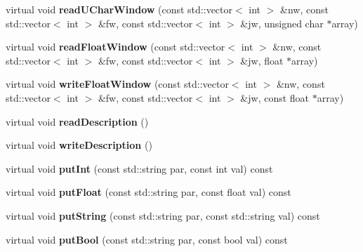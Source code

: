 \begin{DoxyCompactItemize}
virtual void {\bfseries read\+U\+Char\+Window} (const std\+::vector$<$ int $>$ \&nw, const std\+::vector$<$ int $>$ \&fw, const std\+::vector$<$ int $>$ \&jw, unsigned char $\ast$array)
\item 
\mbox{\label{class_s_e_p_1_1sep3d_file_a343dfb7ba9a50909270ef431933d810d}} 
virtual void {\bfseries read\+Float\+Window} (const std\+::vector$<$ int $>$ \&nw, const std\+::vector$<$ int $>$ \&fw, const std\+::vector$<$ int $>$ \&jw, float $\ast$array)
\item 
\mbox{\label{class_s_e_p_1_1sep3d_file_a6edcdb60efc62731e33f60aa32dbc2d4}} 
virtual void {\bfseries write\+Float\+Window} (const std\+::vector$<$ int $>$ \&nw, const std\+::vector$<$ int $>$ \&fw, const std\+::vector$<$ int $>$ \&jw, const float $\ast$array)
\item 
\mbox{\label{class_s_e_p_1_1sep3d_file_acb78ddaf3eb0c1afe66df1b468054d3d}} 
virtual void {\bfseries read\+Description} ()
\item 
\mbox{\label{class_s_e_p_1_1sep3d_file_a5e9edc876aa8b7fc1fa8f1f826655316}} 
virtual void {\bfseries write\+Description} ()
\item 
\mbox{\label{class_s_e_p_1_1sep3d_file_a3b4c3f4417a004c584a1f915a48d6283}} 
virtual void {\bfseries put\+Int} (const std\+::string par, const int val) const
\item 
\mbox{\label{class_s_e_p_1_1sep3d_file_a5bd187b48f431846fe2073f9be218571}} 
virtual void {\bfseries put\+Float} (const std\+::string par, const float val) const
\item 
\mbox{\label{class_s_e_p_1_1sep3d_file_adb308ce796d572e63fa5386068a34e2f}} 
virtual void {\bfseries put\+String} (const std\+::string par, const std\+::string val) const
\item 
\mbox{\label{class_s_e_p_1_1sep3d_file_aa925ee2582eb2cf1db46d74a08db780e}} 
virtual void {\bfseries put\+Bool} (const std\+::string par, const bool val) const
\item 
\mbox{\label{class_s_e_p_1_1sep3d_file_ad309fffe7ce4414751fe7ff981eacc31}} 

\end{DoxyCompactItemize}
